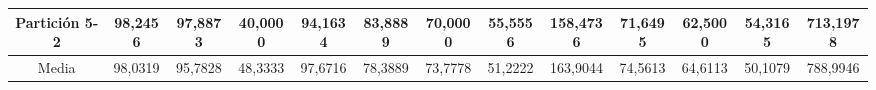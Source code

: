 \documentclass[12pt]{article}
\begin{document}
\begin{table}[H]
{\begin{tabular}{|c|cccc|cccc|cccc|}
Partición 5-2 & \multicolumn{1}{c|}{98,2456}                                                  & \multicolumn{1}{c|}{97,8873}                                                 & \multicolumn{1}{c|}{40,0000} & 94,1634  & \multicolumn{1}{c|}{83,8889}                                                  & \multicolumn{1}{c|}{70,0000}                                                 & \multicolumn{1}{c|}{55,5556} & 158,4736 & \multicolumn{1}{c|}{71,6495}                                                  & \multicolumn{1}{c|}{62,5000}                                                 & \multicolumn{1}{c|}{54,3165} & 713,1978 \\ \hline
Media         & \multicolumn{1}{c|}{98,0319}                                                  & \multicolumn{1}{c|}{95,7828}                                                 & \multicolumn{1}{c|}{48,3333} & 97,6716  & \multicolumn{1}{c|}{78,3889}                                                  & \multicolumn{1}{c|}{73,7778}                                                 & \multicolumn{1}{c|}{51,2222} & 163,9044 & \multicolumn{1}{c|}{74,5613}                                                  & \multicolumn{1}{c|}{64,6113}                                                 & \multicolumn{1}{c|}{50,1079} & 788,9946 \\ \hline
\end{tabular}}
\end{table}
\end{document}
